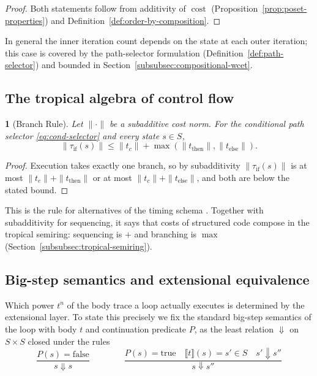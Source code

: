\documentclass[oneside,english]{amsart}
\numberwithin{equation}{section}
\numberwithin{figure}{section}
\theoremstyle{plain}
\theoremstyle{definition}
\theoremstyle{plain}
\newtheorem{prop}[thm]{\protect\propositionname}
\theoremstyle{remark}
\theoremstyle{plain}
\theoremstyle{definition}
\theoremstyle{plain}
\theoremstyle{remark}
\DeclareMathOperator{\cost}{cost}
\newcommand{\sem}[1]{\llbracket #1 \rrbracket}
\newcommand{\bigstep}{\Downarrow}
\providecommand{\propositionname}{Proposition}
\begin{document}
\begin{proof}
Both statements follow from additivity of $\cost$ (Proposition~\ref{prop:poset-properties}) and Definition~\ref{def:order-by-composition}.
\end{proof}

In general the inner iteration count depends on the state at each outer iteration; this case is covered by the path-selector formulation (Definition~\ref{def:path-selector}) and bounded in Section~\ref{subsubsec:compositional-wcet}.

\subsection{The tropical algebra of control flow}

\begin{prop}[Branch Rule]\label{prop:tropical-dominance}
Let $\|\cdot\|$ be a subadditive cost norm. For the conditional path selector \eqref{eq:cond-selector} and every state $s \in S$,
\[
\|\tau_{\text{if}}(s)\| \le \|t_c\| + \max\left(\|t_{\text{then}}\|, \|t_{\text{else}}\|\right).
\]
\end{prop}
\begin{proof}
Execution takes exactly one branch, so by subadditivity $\|\tau_{\text{if}}(s)\|$ is at most $\|t_c\| + \|t_{\text{then}}\|$ or at most $\|t_c\| + \|t_{\text{else}}\|$, and both are below the stated bound.
\end{proof}

This is the rule for alternatives of the timing schema \cite{shaw1989reasoning,puschner1989calculating}. Together with subadditivity for sequencing, it says that costs of structured code compose in the tropical semiring: sequencing is $+$ and branching is $\max$ (Section~\ref{subsubsec:tropical-semiring}).

\subsection{Big-step semantics and extensional equivalence}

Which power $t^n$ of the body trace a loop actually executes is determined by the extensional layer. To state this precisely we fix the standard big-step semantics \cite{kahn1987natural,winskel1993formal} of the loop with body $t$ and continuation predicate $P$, as the least relation $\bigstep$ on $S \times S$ closed under the rules
\begin{equation}
\label{eq:bigstep-while}
\frac{P(s) = \text{false}}{s \bigstep s}
\qquad\qquad
\frac{P(s) = \text{true} \quad \sem{t}(s) = s' \in S \quad s' \bigstep s''}{s \bigstep s''}
\end{equation}
\end{document}
